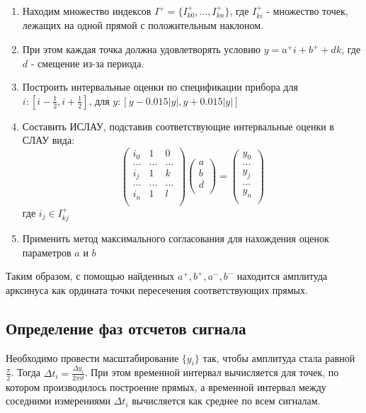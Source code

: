 \documentclass[a4paper]{article}
\begin{document}
\begin{enumerate}
    \item Находим множество индексов $I^+=\{I^+_{k0},...,I^+_{kn}\}$, где $I^+_{ki}$ - множество точек, лежащих на одной прямой с положительным наклоном.
    \item При этом каждая точка должна удовлетворять условию $y=a^+i+b^++dk$, где $d$ - смещение из-за периода.
    \item Построить интервальные оценки по спецификации прибора для $i:[i-\frac{1}{2},i+\frac{1}{2}]$, для $y:[y-0.015|y|,y+0.015|y|]$
    \item Составить ИСЛАУ, подставив соответствующие интервальные оценки в СЛАУ вида:
        \begin{equation}
            \begin{pmatrix}
                i_0 & 1 & 0\\
                ... & ... & ...\\
                i_j & 1 & k\\
                ... & ... & ...\\
                i_n & 1 & l\\        
            \end{pmatrix}
            \begin{pmatrix}
                a\\
                b\\
                d\\
            \end{pmatrix}
            =
            \begin{pmatrix}
                y_0\\
                ...\\
                y_j\\
                ...\\
                y_n\\        
            \end{pmatrix}
        \end{equation}
        где $i_j\in{I^+_{kj}}$
    \item Применить метод максимального согласования для нахождения оценок параметров $a$ и $b$
    \end{enumerate}

Таким образом, с помощью найденных $a^+,b^+,a^-,b^-$ находится амплитуда арксинуса как ордината точки пересечения соответствующих прямых.\cite{VKR}

\subsection{Определение фаз отсчетов сигнала}
    Необходимо провести масштабирование $\{y_i\}$ так, чтобы амплитуда стала равной $\frac{\pi}{2}$. Тогда $\Delta{t_i}=\frac{\Delta{y_i}}{2\pi\vartheta}$.
    При этом временной интервал вычисляется для точек, по котором производилось построение прямых, а временной интервал между соседними измерениями
    $\Delta{t_i}$ вычисляется как среднее по всем сигналам.
\end{document}
